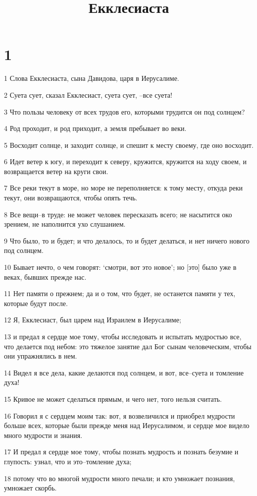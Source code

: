

\title{Екклесиаста}


\chapter{1}

\par 1 Слова Екклесиаста, сына Давидова, царя в Иерусалиме.
\par 2 Суета сует, сказал Екклесиаст, суета сует, --все суета!
\par 3 Что пользы человеку от всех трудов его, которыми трудится он под солнцем?
\par 4 Род проходит, и род приходит, а земля пребывает во веки.
\par 5 Восходит солнце, и заходит солнце, и спешит к месту своему, где оно восходит.
\par 6 Идет ветер к югу, и переходит к северу, кружится, кружится на ходу своем, и возвращается ветер на круги свои.
\par 7 Все реки текут в море, но море не переполняется: к тому месту, откуда реки текут, они возвращаются, чтобы опять течь.
\par 8 Все вещи--в труде: не может человек пересказать всего; не насытится око зрением, не наполнится ухо слушанием.
\par 9 Что было, то и будет; и что делалось, то и будет делаться, и нет ничего нового под солнцем.
\par 10 Бывает нечто, о чем говорят: `смотри, вот это новое'; но [это] было уже в веках, бывших прежде нас.
\par 11 Нет памяти о прежнем; да и о том, что будет, не останется памяти у тех, которые будут после.
\par 12 Я, Екклесиаст, был царем над Израилем в Иерусалиме;
\par 13 и предал я сердце мое тому, чтобы исследовать и испытать мудростью все, что делается под небом: это тяжелое занятие дал Бог сынам человеческим, чтобы они упражнялись в нем.
\par 14 Видел я все дела, какие делаются под солнцем, и вот, все--суета и томление духа!
\par 15 Кривое не может сделаться прямым, и чего нет, того нельзя считать.
\par 16 Говорил я с сердцем моим так: вот, я возвеличился и приобрел мудрости больше всех, которые были прежде меня над Иерусалимом, и сердце мое видело много мудрости и знания.
\par 17 И предал я сердце мое тому, чтобы познать мудрость и познать безумие и глупость: узнал, что и это--томление духа;
\par 18 потому что во многой мудрости много печали; и кто умножает познания, умножает скорбь.

